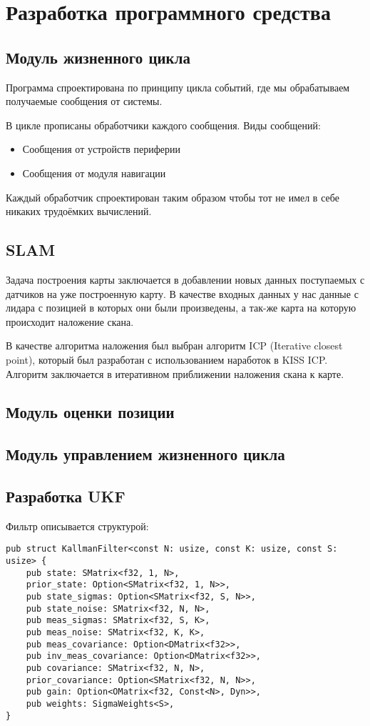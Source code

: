 \section{Разработка программного средства}

\subsection{Модуль жизненного цикла}
Программа спроектирована по принципу цикла событий, где мы обрабатываем получаемые сообщения от системы.

В цикле прописаны обработчики каждого сообщения.
Виды сообщений:
\begin{itemize}
	\item Сообщения от устройств периферии
	\item Сообщения от модуля навигации
\end{itemize}

Каждый обработчик спроектирован таким образом чтобы тот не имел в себе никаких трудоёмких вычислений.

\subsection{SLAM}
Задача построения карты заключается в добавлении новых данных поступаемых с датчиков на уже построенную карту.
В качестве входных данных у нас данные с лидара с позицией в которых они были произведены, а так-же карта на которую происходит наложение скана.

В качестве алгоритма наложения был выбран алгоритм ICP (Iterative closest point), который был разработан с использованием наработок в KISS ICP.
Алгоритм заключается в итеративном приближении наложения скана к карте.

\subsection{Модуль оценки позиции}

\subsection{Модуль управлением жизненного цикла}





\subsection{Разработка UKF}
Фильтр описывается структурой:
\begin{lstlisting}
pub struct KallmanFilter<const N: usize, const K: usize, const S: usize> {
    pub state: SMatrix<f32, 1, N>,
    prior_state: Option<SMatrix<f32, 1, N>>,
    pub state_sigmas: Option<SMatrix<f32, S, N>>,
    pub state_noise: SMatrix<f32, N, N>,
    pub meas_sigmas: SMatrix<f32, S, K>,
    pub meas_noise: SMatrix<f32, K, K>,
    pub meas_covariance: Option<DMatrix<f32>>,
    pub inv_meas_covariance: Option<DMatrix<f32>>,
    pub covariance: SMatrix<f32, N, N>,
    prior_covariance: Option<SMatrix<f32, N, N>>,
    pub gain: Option<OMatrix<f32, Const<N>, Dyn>>,
    pub weights: SigmaWeights<S>,
}
\end{lstlisting}


